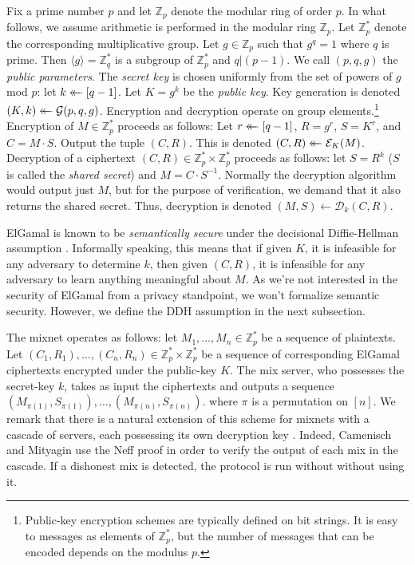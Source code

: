 \documentclass[letter]{article}
\newcounter{foot}
\newcommand{\Zmodp}{\mathbb{Z}_p}
\newcommand{\Zmodq}{\mathbb{Z}_q}
\newcommand*\by{\times}
\newcommand{\getsr}{\mathrel{\leftarrow\mkern-14mu\leftarrow}}
\newcommand{\brackets}[1]{\langle #1 \rangle}
\newcommand{\pk}{K}
\newcommand{\sk}{k}
\newcommand{\varm}{M}
\newcommand{\varc}{C}
\newcommand{\varr}{R}
\newcommand{\gen}{\mathcal{G}}
\newcommand{\enc}{\mathcal{E}}
\newcommand{\dec}{\mathcal{D}}
\begin{document}
Fix a prime number $p$ and let $\Zmodp$ denote the modular ring of order $p$.
In what follows, we assume arithmetic is performed in the modular ring $\Zmodp$.
Let $\Zmodp^*$ denote the corresponding multiplicative group.
Let $g \in \Zmodp$ such that $g^q = 1$ where $q$ is prime. Then $\brackets{g} =
\Zmodq^*$ is a subgroup of $\Zmodp^*$ and $q | (p-1)$. We call $(p, q, g)$ the
\textit{public parameters}. The \textit{secret key} is chosen uniformly from
the set of powers of $g$ mod $p$: let $\sk \getsr [q-1]$. Let $\pk = g^\sk$ be
the \textit{public key}. Key generation is denoted $(K, k) \getsr \gen(p, q,
g)$.
Encryption and decryption operate on group elements.\footnote{
Public-key encryption schemes are typically defined on bit
strings. It is easy to messages as elements of $\Zmodp^*$, but the number of
messages that can be encoded depends on the modulus $p$.}
Encryption of $M \in \Zmodp^*$ proceeds as follows:
Let $r \getsr [q-1]$,
$R = g^r$,
$S = K^r$, and
$C = M \cdot S$.
Output the tuple $(C, R)$.
This is denoted $(C, R) \getsr \enc_K(M)$.
Decryption of a ciphertext $(C, R) \in \Zmodp^* \by \Zmodp^*$ proceeds as follows:
let $S = R^\sk$ ($S$ is called the \emph{shared secret}) and
$M = C \cdot S^{-1}$.
Normally the decryption algorithm would output just $M$, but for the purpose of
verification, we demand that it also returns the shared secret. Thus,
decryption is denoted $(M, S) \gets \dec_k(C, R)$.

ElGamal is known to be \textit{semantically secure} under the
decisional Diffie-Hellman assumption \cite{elgamal84,ty98}. Informally speaking, this
means that if given $\pk$, it is infeasible for any adversary to determine
$\sk$, then given $(C,R)$, it is infeasible for any adversary to
learn anything meaningful about $M$. As we're not
interested in the security of ElGamal from a privacy standpoint, we won't
formalize semantic security. However, we define the DDH assumption in the next
subsection.

The mixnet operates as follows:
let $\varm_1, \ldots, \varm_n \in \Zmodp^*$ be a sequence of plaintexts.
Let $(\varc_1, \varr_1), \ldots, (\varc_n, \varr_n) \in \Zmodp^* \by \Zmodp^*$ be a
sequence of corresponding ElGamal ciphertexts encrypted under the public-key
$\pk$. The mix server, who possesses the secret-key $\sk$, takes as input
the ciphertexts and outputs a sequence $(\varm_{\pi(1)}, S_{\pi(1)}), \ldots,
(\varm_{\pi(n)}, S_{\pi(n)})$.
where $\pi$ is a permutation on $[n]$.
We remark that there is a natural extension of this scheme for mixnets with a
cascade of servers, each possessing its own decryption key \cite{cm06}. Indeed,
Camenisch and Mityagin use the Neff proof in order to verify the output of each
mix in the cascade. If a dishonest mix is detected, the protocol is run without
without using it.
\end{document}
